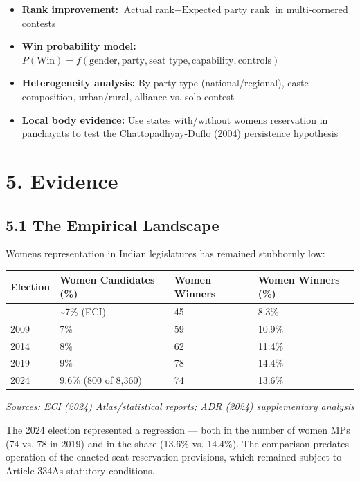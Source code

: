 \documentclass[
]{article}
\newcounter{none} %
\providecommand{\tightlist}{%
  \setlength{\itemsep}{0pt}\setlength{\parskip}{0pt}}
\begin{document}
\begin{itemize}
\tightlist
\item
  \textbf{Rank improvement:} \(\text{Actual rank} - \text{Expected party rank}\) in multi-cornered contests
\item
  \textbf{Win probability model:} \(P(\text{Win}) = f(\text{gender}, \text{party}, \text{seat type}, \text{capability}, \text{controls})\)
\item
  \textbf{Heterogeneity analysis:} By party type (national/regional), caste composition, urban/rural, alliance vs. solo contest
\item
  \textbf{Local body evidence:} Use states with/without women\textquotesingle s reservation in panchayats to test the Chattopadhyay-Duflo (2004) persistence hypothesis
\end{itemize}

\section{5. Evidence}\label{5-evidence}

\subsection{5.1 The Empirical Landscape}\label{51-the-empirical-landscape}

Women\textquotesingle s representation in Indian legislatures has remained stubbornly low:

{\def\LTcaptype{none} %
\begin{longtable}[]{@{}llll@{}}
\toprule\noalign{}
Election & Women Candidates (\%) & Women Winners & Women Winners (\%) \\
\midrule\noalign{}
\endhead
\bottomrule\noalign{}
\endlastfoot
2004 & \textasciitilde7\% (ECI) & 45 & 8.3\% \\
2009 & 7\% & 59 & 10.9\% \\
2014 & 8\% & 62 & 11.4\% \\
2019 & 9\% & 78 & 14.4\% \\
2024 & 9.6\% (800 of 8,360) & 74 & 13.6\% \\
\end{longtable}
}

\emph{Sources: ECI (2024) Atlas/statistical reports; ADR (2024) supplementary analysis}

The 2024 election represented a regression --- both in the number of women MPs (74 vs. 78 in 2019) and in the share (13.6\% vs. 14.4\%). The comparison predates operation of the enacted seat-reservation provisions, which remained subject to Article 334A\textquotesingle s statutory conditions.
\end{document}
